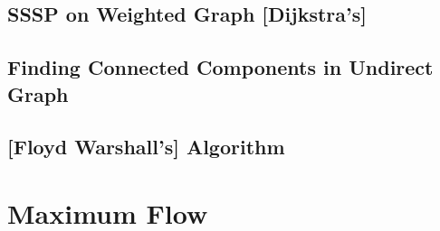 	\subsection {SSSP on Weighted Graph [Dijkstra's]}
	  
	\subsection {Finding Connected Components in Undirect Graph}
		
	\subsection {[Floyd Warshall's] Algorithm}
        
\section {Maximum Flow}
